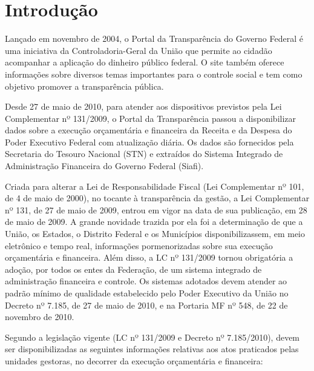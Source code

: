 
\chapter{Introdução}\label{intro}
Lançado em novembro de 2004, o Portal da Transparência do Governo Federal é uma iniciativa da Controladoria-Geral da União que permite ao cidadão acompanhar a aplicação do dinheiro público federal. O site também oferece informações sobre diversos temas importantes para o controle social e tem como objetivo promover a transparência pública. \cite{guiaTransparencia2013}

Desde 27 de maio de 2010, para atender aos dispositivos previstos pela Lei Complementar nº 131/2009, o Portal da Transparência passou a disponibilizar dados sobre a execução orçamentária e financeira da Receita e da Despesa do Poder Executivo Federal com atualização diária. Os dados são fornecidos pela Secretaria do Tesouro Nacional (STN) e extraídos do Sistema Integrado de Administração Financeira do Governo Federal (Siafi). 

Criada para alterar a Lei de Responsabilidade Fiscal (Lei Complementar nº 101, de 4 de maio de 2000), no tocante à transparência da gestão, a Lei Complementar nº 131, de 27 de maio de 2009, entrou em vigor na data de sua publicação, em 28 de maio de 2009. A grande novidade trazida por ela foi a determinação de que a União, os Estados, o Distrito Federal e os Municípios disponibilizassem, em meio eletrônico e tempo real, informações pormenorizadas sobre sua execução orçamentária e financeira. Além disso, a LC nº 131/2009 tornou obrigatória a adoção, por todos os entes da Federação, de um sistema integrado de administração financeira e controle. Os sistemas adotados devem atender ao padrão mínimo de qualidade estabelecido pelo Poder Executivo da União no Decreto nº 7.185, de 27 de maio de 2010, e na Portaria MF nº 548, de 22 de novembro de 2010. \cite{guiaTransparencia2013} 

Segundo a legislação vigente (LC nº 131/2009 e Decreto nº 7.185/2010), devem ser disponibilizadas as seguintes informações relativas aos atos praticados pelas unidades gestoras, no decorrer da execução orçamentária e financeira:  

